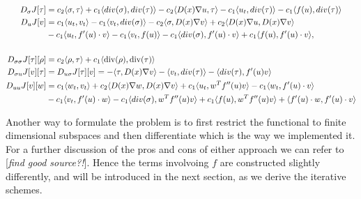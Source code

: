 \documentclass[../draft_1.tex]{subfiles}
\begin{document}
\begin{ceqn}
\begin{align}
D_{\sigma} J [\tau] &= c_2 \langle \sigma, \tau \rangle + c_1 \langle div(\sigma), div(\tau) \rangle - c_2 \langle D(x) \nabla u, \tau \rangle - c_1 \langle u_t, div(\tau) \rangle - c_1 \langle f(u), div(\tau) \rangle \\
D_{u} J [v] &=  c_1 \langle u_t, v_t \rangle - c_1 \langle v_t, div(\sigma) \rangle - c_2 \langle \sigma, D(x) \nabla v \rangle + c_2 \langle D(x) \nabla u, D(x) \nabla v \rangle  \\  
&- c_1 \langle u_t, f'(u) \cdot v \rangle  - c_1 \langle v_t, f(u) \rangle  - c_1 \langle div(\sigma), f'(u) \cdot v \rangle + c_1 \langle f(u), f'(u) \cdot v \rangle, \\
\\
D_{\sigma \sigma} J [\tau] [\rho] &= c_2 \langle \rho, \tau \rangle + c_1 \langle \mathop{}\!\mathrm{div}(\rho), \mathop{}\!\mathrm{div}(\tau) \rangle  \\
D_{\sigma u}J  [v][\tau] &= D_{u \sigma}J  [\tau] [v] = - \langle \tau, D(x) \nabla v \rangle - \langle v_t, div(\tau) \rangle - \langle div(\tau), f'(u) v \rangle \\
D_{uu} J  [v][w] &= c_1 \langle w_t, v_t \rangle + c_2 \langle D(x) \nabla w, D(x) \nabla v \rangle + c_1 \langle u_t, w^T f''(u) v \rangle - c_1 \langle w_t, f'(u) \cdot v \rangle \\
&- c_1 \langle v_t, f'(u) \cdot w \rangle 
 - c_1 \langle div(\sigma), w^T f''(u) v \rangle + c_1 \langle f(u), w^T f''(u) v \rangle + \langle f'(u) \cdot w, f'(u) \cdot v \rangle 
\end{align}
\end{ceqn}



Another way to formulate the problem is to first restrict the functional to finite dimensional subspaces and then differentiate which is the way we implemented it. For a further discussion of the pros and cons of either approach we can refer to [\textit{find good source?!}]. Hence the terms involvoing $f$ are constructed slightly differently, and will be introduced in the next section, as we derive the iterative schemes. 
\end{document}
